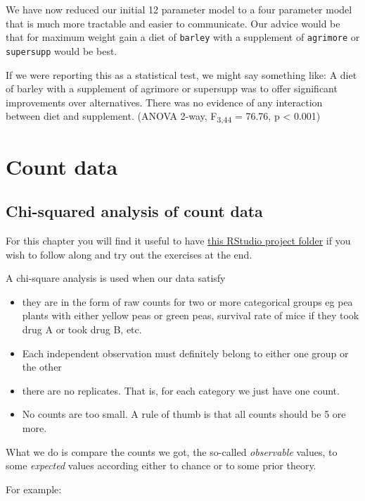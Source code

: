 \documentclass[
  letterpaper,
  DIV=11,
  numbers=noendperiod]{scrreprt}
\providecommand{\tightlist}{%
  \setlength{\itemsep}{0pt}\setlength{\parskip}{0pt}}\usepackage{longtable,booktabs,array}
\begin{document}
We have now reduced our initial 12 parameter model to a four parameter
model that is much more tractable and easier to communicate. Our advice
would be that for maximum weight gain a diet of \texttt{barley} with a
supplement of \texttt{agrimore} or \texttt{supersupp} would be best.

If we were reporting this as a statistical test, we might say something
like: A diet of barley with a supplement of agrimore or supersupp was to
offer significant improvements over alternatives. There was no evidence
of any interaction between diet and supplement. (ANOVA 2-way,
F\textsubscript{3,44} = 76.76, p \textless{} 0.001)

\part{Count data}

\chapter{Chi-squared analysis of count
data}\label{chi-squared-analysis-of-count-data}

For this chapter you will find it useful to have
\href{https://github.com/mbh038/chi-square/archive/refs/heads/main.zip}{this
RStudio project folder} if you wish to follow along and try out the
exercises at the end.

A chi-square analysis is used when our data satisfy

\begin{itemize}
\tightlist
\item
  they are in the form of raw counts for two or more categorical groups
  eg pea plants with either yellow peas or green peas, survival rate of
  mice if they took drug A or took drug B, etc.
\item
  Each independent observation must definitely belong to either one
  group or the other
\item
  there are no replicates. That is, for each category we just have one
  count.
\item
  No counts are too small. A rule of thumb is that all counts should be
  5 ore more.
\end{itemize}

What we do is compare the counts we got, the so-called \emph{observable}
values, to some \emph{expected} values according either to chance or to
some prior theory.

For example:
\end{document}
